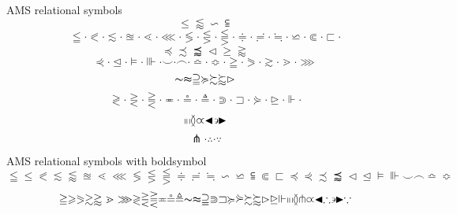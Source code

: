 \documentclass[12pt,a4paper]{article}
\theoremstyle{clearprint}
\begin{document}
\noindent
AMS relational symbols
\begin{equation}
\leqslant \lessapprox \backsim \subseteqq
\end{equation}
\begin{equation}
\leqq \cdot \eqslantless \cdot \lesssim \cdot \approxeq \cdot \lessdot \cdot \lll \cdot \lessgtr \cdot \lesseqgtr \cdot \lesseqqgtr \cdot \doteqdot \cdot \risingdotseq \cdot \fallingdotseq \cdot \backsimeq \cdot \Subset \cdot \sqsubset \cdot 
\end{equation}
\begin{equation}
\preccurlyeq \precsim \precapprox \vartriangleleft \geqslant \gtrapprox 
\end{equation}
\begin{equation}
\curlyeqprec \cdot \trianglelefteq \cdot \vDash \cdot \Vvdash \cdot \smallsmile \cdot \smallfrown \cdot \bumpeq \cdot \Bumpeq \cdot \geqq \cdot \eqslantgtr \cdot \gtrsim \cdot  \gtrdot \cdot \ggg 
\end{equation}
\begin{equation}
\thicksim \thickapprox \supseteqq \succcurlyeq \succsim \succapprox \vartriangleright 
\end{equation}
\begin{equation}
\gtrless \cdot \gtreqless \cdot \gtreqqless \cdot \eqcirc \cdot \circeq \cdot \triangleq  \cdot \Supset \cdot \sqsupset \cdot \curlyeqsucc \cdot  \trianglerighteq \cdot \Vdash \cdot 
\end{equation}
\begin{equation}
\shortmid \shortparallel \between \varpropto \blacktriangleleft \backepsilon \blacktriangleright
\end{equation}
\begin{equation}
\pitchfork \cdot  \therefore \cdot  \because
\end{equation}

\noindent
AMS relational symbols with boldsymbol
\begin{equation}
\boldsymbol{\leqq \leqslant \eqslantless \lesssim \lessapprox \approxeq \lessdot \lll \lessgtr \lesseqgtr \lesseqqgtr \doteqdot \risingdotseq \fallingdotseq \backsim \backsimeq \subseteqq \Subset \sqsubset \preccurlyeq \curlyeqprec \precsim \precapprox \vartriangleleft \trianglelefteq \vDash \Vvdash \smallsmile \smallfrown \bumpeq \Bumpeq} 
\end{equation}
\begin{equation}
\boldsymbol{\geqq \geqslant \eqslantgtr \gtrsim \gtrapprox  \gtrdot \ggg \gtrless \gtreqless \gtreqqless \eqcirc \circeq \triangleq \thicksim \thickapprox \supseteqq \Supset \sqsupset \succcurlyeq \curlyeqsucc \succsim \succapprox \vartriangleright \trianglerighteq \Vdash \shortmid \shortparallel \between \pitchfork \varpropto \blacktriangleleft \therefore \backepsilon \blacktriangleright \because}
\end{equation}
\end{document}
